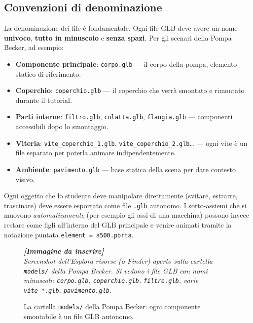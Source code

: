 ﻿\documentclass[a4paper,12pt,oneside]{book}
\newcommand{\kw}[1]{\texttt{\color{keycolor}#1}}
\newcommand{\file}[1]{\texttt{#1}}
\newcommand{\imgph}[2]{%
  \begin{tcolorbox}[colback=cvtlightblue!30,colframe=cvtblue!40,%
    width=#1,halign=center,valign=center,height=5cm,boxrule=0.5pt,arc=3pt]%
    \textcolor{cvtgray}{\itshape\footnotesize\textbf{[Immagine da inserire]}\\[3pt]#2}%
  \end{tcolorbox}}
\begin{document}
\subsection{Convenzioni di denominazione}

La denominazione dei file è fondamentale. Ogni file GLB deve avere un
nome \textbf{univoco}, \textbf{tutto in minuscolo} e \textbf{senza spazi}.
Per gli scenari della Pompa Becker, ad esempio:

\begin{itemize}
  \item \textbf{Componente principale}: \file{corpo.glb} --- il corpo
        della pompa, elemento statico di riferimento.
  \item \textbf{Coperchio}: \file{coperchio.glb} --- il coperchio che
        verrà smontato e rimontato durante il tutorial.
  \item \textbf{Parti interne}: \file{filtro.glb}, \file{culatta.glb},
        \file{flangia.glb} --- componenti accessibili dopo lo smontaggio.
  \item \textbf{Viteria}: \file{vite\_coperchio\_1.glb},
        \file{vite\_coperchio\_2.glb}\ldots{} --- ogni vite è un file
        separato per poterla animare indipendentemente.
  \item \textbf{Ambiente}: \file{pavimento.glb} --- base statica della
        scena per dare contesto visivo.
\end{itemize}

\begin{attenzione}
Ogni oggetto che lo studente deve manipolare direttamente (svitare,
estrarre, trascinare) deve essere esportato come file \file{.glb}
autonomo. I sotto-assiemi che si muovono \emph{automaticamente} (per
esempio gli assi di una macchina) possono invece restare come figli
all'interno del GLB principale e venire animati tramite la notazione
puntata \kw{element = a500.porta}.
\end{attenzione}

\begin{figure}[H]
  \centering
  \imgph{11cm}{Screenshot dell'Esplora risorse (o Finder) aperto sulla cartella \file{models/} della Pompa Becker. Si vedono i file GLB con nomi minuscoli: \file{corpo.glb}, \file{coperchio.glb}, \file{filtro.glb}, varie \file{vite\_*.glb}, \file{pavimento.glb}.}
  \caption{La cartella \file{models/} della Pompa Becker: ogni componente smontabile è un file GLB autonomo.}
  \label{fig:cartella-models}
\end{figure}
\end{document}

